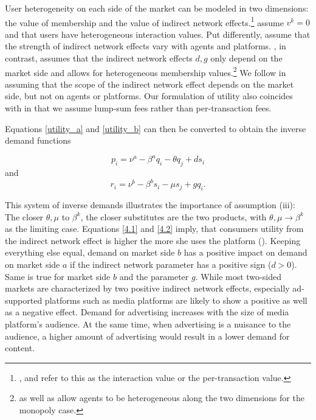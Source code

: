 \documentclass[12pt,a4paper]{scrreprt}
\begin{document}
User heterogeneity on each side of the market can be modeled in two dimensions: the value of membership and the value of indirect network effects.\footnote{\cite{weyl_price_2010}, \cite{rochet_platform_2003} and \cite{armstrong_competition_2006} refer to this as the interaction value or the per-transaction value.} \cite{rochet_platform_2003} assume $v^k=0$ and that users have heterogeneous interaction values. Put differently, \cite{rochet_platform_2003} assume that the strength of indirect network effects vary with agents and platforms. \cite{armstrong_competition_2006}, in contrast, assumes that the indirect network effects $d,g$ only depend on the market side and allows for heterogeneous membership values.\footnote{\cite{rochet_platform_2003} as well as \cite{weyl_price_2010} allow agents to be heterogeneous along the two dimensions for the monopoly case.} We follow \cite{armstrong_competition_2006} in assuming that the scope of the indirect network effect depends on the market side, but not on agents or platforms. Our formulation of utility also coincides with \cite{armstrong_competition_2006} in that we assume lump-sum fees rather than per-transaction fees. 

Equations \ref{utility_a} and \ref{utility_b} can then be converted to obtain the inverse demand functions

\begin{equation}
p_i=\nu^a-\beta^a q_i - \theta q_j +ds_i
\end{equation}
and
\begin{equation}
r_i=\nu^b-\beta^b s_i - \mu s_j +gq_i.
\end{equation} 

This system of inverse demands illustrates the importance of assumption (iii): The closer $\theta, \mu$ to $\beta^k$, the closer substitutes are the two products, with $\theta, \mu \to \beta^ k$ as the limiting case. Equations \ref{4.1} and \ref{4.2} imply, that consumers utility from the indirect network effect is higher the more she uses the platform (\cite{kind_business_2009}). Keeping everything else equal, demand on market side $b$ has a positive impact on demand on market side $a$ if the indirect network parameter has a positive sign ($d > 0$). Same is true for market side $b$ and the parameter $g$. While most two-sided markets are characterized by two positive indirect network effects, especially ad-supported platforms such as media platforms are likely to show a positive as well as a negative effect. Demand for advertising increases with the size of media platform's audience. At the same time, when advertising is a nuisance to the audience, a higher amount of advertising would result in a lower demand for content.
\end{document}
